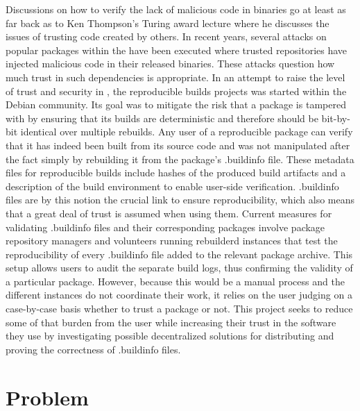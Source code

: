 \documentclass[english, biblatex, digitaloutput]{kththesis}
\begin{document}
Discussions on how to verify the lack of malicious code in binaries go at least as far back as to Ken Thompson's Turing award lecture \cite{thompson_reflections_1984} where he discusses the issues of trusting code created by others. In recent years, several attacks on popular packages within the  have been executed \cite{lamb_reproducible_2021} where trusted repositories have injected malicious code in their released binaries. These attacks question how much trust in such dependencies is appropriate. In an attempt to raise the level of trust and security in , the reproducible builds projects \cite{reproducible_builds_project} was started within the Debian community. Its goal was to mitigate the risk that a package is tampered with by ensuring that its builds are deterministic and therefore should be bit-by-bit identical over multiple rebuilds. Any user of a reproducible package can verify that it has indeed been built from its source code and was not manipulated after the fact simply by rebuilding it from the package's .buildinfo file. These metadata files for reproducible builds include hashes of the produced build artifacts and a description of the build environment to enable user-side verification. .buildinfo files are by this notion the crucial link to ensure reproducibility, which also means that a great deal of trust is assumed when using them. Current measures for validating .buildinfo files and their corresponding packages involve package repository managers and volunteers running rebuilderd \cite{rebuilderd_public_nodate} instances that test the reproducibility of every .buildinfo file added to the relevant package archive. This setup allows users to audit the separate build logs, thus confirming the validity of a particular package. However, because this would be a manual process and the different instances do not coordinate their work, it relies on the user judging on a case-by-case basis whether to trust a package or not. This project seeks to reduce some of that burden from the user while increasing their trust in the software they use by investigating possible decentralized solutions for distributing and proving the correctness of .buildinfo files.


\section{Problem}
\label{sec:problem}
\end{document}

